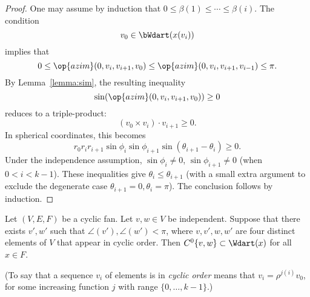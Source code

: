 \begin{proof}
 One may assume by induction that $0\le \beta(1)\le\cdots\le \beta(i)$.  The condition
$$
v_0\in \bWdart(x(v_i))
$$
implies that
$$
0 \le \op{azim}(0,v_i,v_{i+1},v_0)\le \op{azim}(0,v_i,v_{i+1},v_{i-1})\le\pi.
$$
By Lemma~\ref{lemma:sim}, the resulting inequality
$$
\sin(\op{azim}(0,v_i,v_{i+1},v_0))\ge 0
$$
reduces to a triple-product:
$$
(v_0 \times v_i)\cdot v_{i+1}\ge 0.
$$
In spherical coordinates, this becomes
$$
r_0r_ir_{i+1}\sin\phi_i\sin\phi_{i+1}\sin(\theta_{i+1}-\theta_i)\ge0.
$$
Under the independence assumption, $\sin\phi_i\ne0$, $\sin\phi_{i+1}\ne0$ (when $0< i < k-1$).    These inequalities give $\theta_i\le\theta_{i+1}$ (with a small extra argument to exclude the degenerate case $\theta_{i+1}=0,\theta_i=\pi$).  The conclusion follows by induction.
%
\end{proof}

\begin{lemma}  
Let $(V,E,F)$ be a cyclic fan. 
Let $v,w\in V$ be independent.  Suppose that there exists $v',w'$ such
that $\angle(v'),\angle(w')<\pi$, where $v,v',w,w'$ are four distinct elements of
$V$ that appear in cyclic order.
Then $C^0\{v,w\}\subset \Wdart(x)$ for all $x\in F$.
\end{lemma}
%
%
%

(To say that a sequence $v_i$ of elements is in {\it cyclic order} means that
$v_i = \rho^{j (i)}v_0$, for some increasing function $j$ with range $\{0,\ldots,k-1\}$.)

